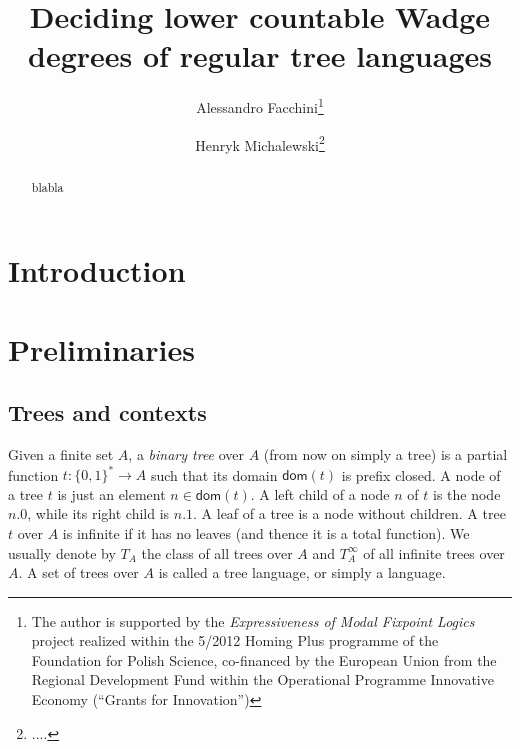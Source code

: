 \documentclass{llncs}
\newcommand {\dom}{\mathsf{dom}}
\begin{document}
%
\frontmatter          %
%
\pagestyle{headings}  %
\addtocmark{} %
%
%
\mainmatter              %
%
\title{Deciding lower countable Wadge degrees of regular tree languages}
%
%

%
\author{
Alessandro Facchini\thanks{The author is supported by the \emph{Expressiveness of Modal Fixpoint Logics} project realized within the 5/2012 Homing Plus programme of the Foundation for Polish Science, co-financed by the European Union from the Regional Development Fund within the Operational Programme Innovative Economy (``Grants for Innovation'')} \and Henryk Michalewski\thanks{....}}


\maketitle              %


\begin{abstract}
\noindent blabla
\end{abstract}



\section{Introduction}



\section{Preliminaries}
\subsection{Trees and contexts}
Given a finite set $A$, a \emph{binary tree} over $A$ (from now on simply a tree) is a partial function $t: \{0,1\}^* \to A$ such that its domain $\dom(t)$ is prefix closed. A node of a tree $t$ is just an element $n \in \dom(t)$. A left child of a node $n$ of $t$ is the node $n.0$, while its right child is $n.1$. A leaf of a tree is a node without children. A tree $t$ over $A$ is infinite if it has no leaves (and thence it is a total function). We usually denote by $T_A$ the class of all  trees over $A$ and $T^\infty_A$ of all infinite trees over $A$. A set of trees over $A$ is called a tree language, or simply a language.
\end{document}
